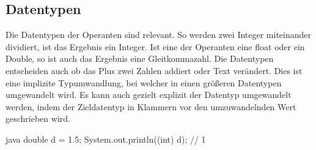 \documentclass{article}
\begin{document}
\subsection{Datentypen}
Die Datentypen der Operanten sind relevant. So werden zwei Integer miteinander dividiert, ist das Ergebnis ein Integer. Ist eine der Operanten eine float oder ein Double, so ist auch das Ergebnis eine Gleitkommazahl. Die Datentypen entscheiden auch ob das Plus zwei Zahlen addiert oder Text verändert.
Dies ist eine implizite Typumwandlung, bei welcher in einen größeren Datentypen umgewandelt wird. Es kann auch gezielt explizit der Datentyp umgewandelt werden, indem der Zieldatentyp in Klammern vor den umzuwandelnden Wert geschrieben wird.
\begin{sourcecode}{java}
double d = 1.5;
System.out.println((int) d); // 1
\end{sourcecode}
\end{document}
